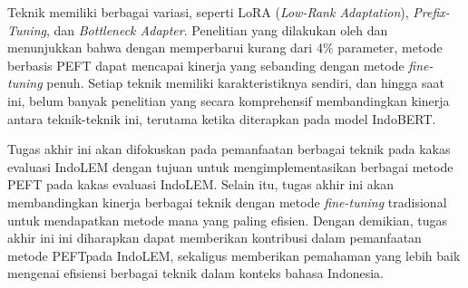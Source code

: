 Teknik \PEFT memiliki berbagai variasi, seperti LoRA (\textit{Low-Rank Adaptation}), \textit{Prefix-Tuning}, dan \textit{Bottleneck Adapter}. Penelitian yang dilakukan oleh \citeauthor{adapter} \parencite{adapter} dan \citeauthor{uvpl} \parencite{uvpl} menunjukkan bahwa dengan memperbarui kurang dari 4\% parameter, metode berbasis PEFT dapat mencapai kinerja yang sebanding dengan metode \textit{fine-tuning} penuh. Setiap teknik memiliki karakteristiknya sendiri, dan hingga saat ini, belum banyak penelitian yang secara komprehensif membandingkan kinerja antara teknik-teknik ini, terutama ketika diterapkan pada model IndoBERT. 

Tugas akhir ini akan difokuskan pada pemanfaatan berbagai teknik \PEFT pada kakas evaluasi IndoLEM dengan tujuan untuk mengimplementasikan berbagai metode PEFT pada kakas evaluasi IndoLEM. Selain itu, tugas akhir ini akan membandingkan kinerja berbagai teknik \PEFT dengan metode \textit{fine-tuning} tradisional untuk mendapatkan metode mana yang paling efisien. Dengan demikian, tugas akhir ini ini diharapkan dapat memberikan kontribusi dalam pemanfaatan metode PEFTpada IndoLEM, sekaligus memberikan pemahaman yang lebih baik mengenai efisiensi berbagai teknik \PEFT dalam konteks bahasa Indonesia.
